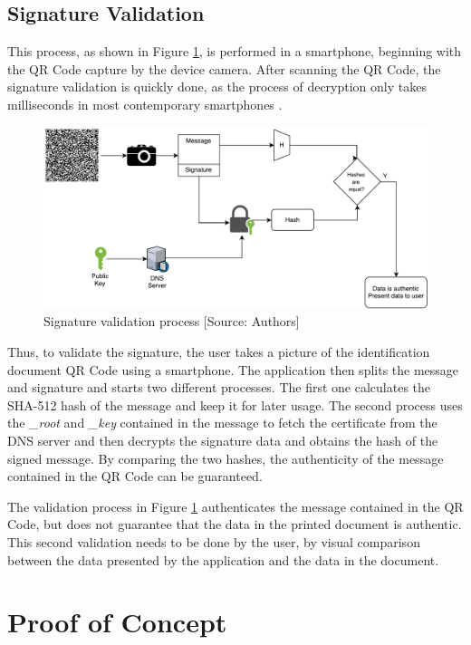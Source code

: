\documentclass[12pt]{article}
\begin{document}
\subsection{Signature Validation}

This process, as shown in Figure \ref{fig:verification}, is performed in a smartphone, beginning with the QR Code capture by the device camera. After scanning the QR Code, the signature validation is quickly done, as the process of decryption only takes milliseconds in most contemporary smartphones \cite{thiranant2015performance}. 

\begin{figure}[ht]
    \centering
    \includegraphics[width=.8\textwidth]{verification.pdf}
    \caption{Signature validation process [Source: Authors]}
    \label{fig:verification}
\end{figure}

Thus, to validate the signature, the user takes a picture of the identification document QR Code using a smartphone. The application then splits the message and signature and starts two different processes. The first one calculates the SHA-512 hash of the message and keep it for later usage. The second process uses the \textit{\_root} and \textit{\_key} contained in the message to fetch the certificate from the DNS server and then decrypts the signature data and obtains the hash of the signed message. By comparing the two hashes, the authenticity of the message contained in the QR Code can be guaranteed. 

The validation process in Figure \ref{fig:verification} authenticates the message contained in the QR Code, but does not guarantee that the data in the printed document is authentic. This second validation needs to be done by the user, by visual comparison between the data presented by the application and the data in the document. 

\section{Proof of Concept}
\end{document}
